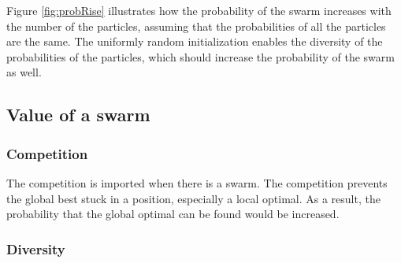 Figure \ref{fig:probRise} illustrates how the probability of the swarm increases with the number of the particles, assuming that the probabilities of all the particles are the same.
The uniformly random initialization enables the diversity of the probabilities of the particles, which should increase the probability of the swarm as well.


\subsection{Value of a swarm}





\subsubsection{Competition}

The competition is imported when there is a swarm.
The competition prevents the global best stuck in a position, especially a local optimal.
As a result, the probability that the global optimal can be found would be increased.

\subsubsection{Diversity}


